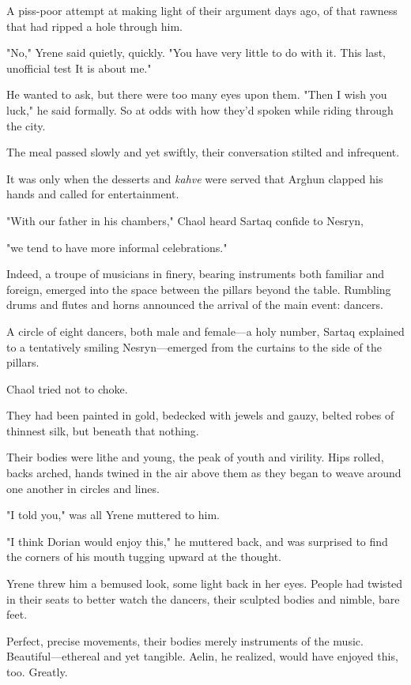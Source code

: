 A piss-poor attempt at making light of their argument days ago, of that rawness that had ripped a hole through him.

"No," Yrene said quietly, quickly. "You have very little to do with it. This last, unofficial test  It is about me."

He wanted to ask, but there were too many eyes upon them. "Then I wish you luck," he said formally. So at odds with how they'd spoken while riding through the city.

The meal passed slowly and yet swiftly, their conversation stilted and infrequent.

It was only when the desserts and \emph{kahve} were served that Arghun clapped his hands and called for entertainment.

"With our father in his chambers," Chaol heard Sartaq confide to Nesryn,

"we tend to have more  informal celebrations."

Indeed, a troupe of musicians in finery, bearing instruments both familiar and foreign, emerged into the space between the pillars beyond the table. Rumbling drums and flutes and horns announced the arrival of the main event: dancers.

A circle of eight dancers, both male and female---a holy number, Sartaq explained to a tentatively smiling Nesryn---emerged from the curtains to the side of the pillars.

Chaol tried not to choke.

They had been painted in gold, bedecked with jewels and gauzy, belted robes of thinnest silk, but beneath that  nothing.

Their bodies were lithe and young, the peak of youth and virility. Hips rolled, backs arched, hands twined in the air above them as they began to weave around one another in circles and lines.

"I told you," was all Yrene muttered to him.

"I think Dorian would enjoy this," he muttered back, and was surprised to find the corners of his mouth tugging upward at the thought.

Yrene threw him a bemused look, some light back in her eyes. People had twisted in their seats to better watch the dancers, their sculpted bodies and nimble, bare feet.

Perfect, precise movements, their bodies merely instruments of the music. Beautiful---ethereal and yet  tangible. Aelin, he realized, would have enjoyed this, too. Greatly.

